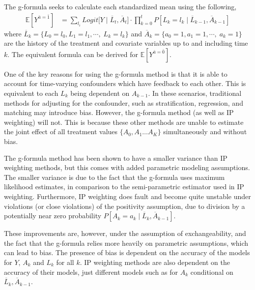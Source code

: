 The g-formula seeks to calculate each standardized mean using the following, 
\begin{align} \label{eq:3} 
\mathbb{E}[Y^{\bar{a}= \bar{1}}] &= \sum_{l_i} Logit \big[Y \mid  \overline{L}_{t}, \overline{A}_{t} \big]\cdot \prod_{k=0}^t P[L_k = l_k \mid \overline{L}_{k-1}, \overline{A}_{k-1}]
\end{align}
where $\overline{L}_k = \{L_{0} = l_0, L_{1} = l_1,  \cdots, \; L_{k} = l_k\}$ and $\overline{A}_k = \{a_{0} = 1, a_{1} = 1,  \cdots, \; a_{k} = 1\}$ are the history of the treatment and covariate variables up to and including time $k$.  The equivalent formula can be derived for $ \mathbb{E}[Y^{\bar{a} = \bar{0}}]$.   


One of the key reasons for using the g-formula method is that it is able to account for time-varying confounders which have feedback to each other.  This is equivalent to each $L_k$ being dependent on $A_{k-1}$.\cite{robins1986new}  In these scenarios, traditional methods for adjusting for the confounder, such as stratification, regression, and matching may introduce bias. However, the g-formula method (as well as IP weighting) will not.\cite{wright2015international}  This is because these other methods are unable to estimate the joint effect of all treatment values $\{A_0, A_1 \dots A_K \}$ simultaneously and without bias.\cite{fitzmaurice2008longitudinal}  

The g-formula method has been shown to have a smaller variance than IP weighting methods, but this comes with added parametric modeling assumptions.\cite{young2011comparative} The smaller variance is due to the fact that the g-formula uses maximum likelihood estimates, in comparison to the semi-parametric estimator used in IP weighting. Furthermore, IP weighting does fault and become quite unstable under violations (or close violations) of the positivity assumption, due to division by a potentially near zero probability $P[A_k=a_k \mid \overline{L}_k, \overline{A}_{k-1}]$.  

These improvements are, however, under the assumption of exchangeability, and the fact that the g-formula relies more heavily on parametric assumptions, which can lead to bias.  The presence of bias is dependent on the accuracy of the models for $Y$, $A_k$ and $L_k$ for all $k$.  IP weighting methods are also dependent on the accuracy of their models, just different models such as for $A_k$ conditional on $\overline{L}_k, \overline{A}_{k-1}$.  

